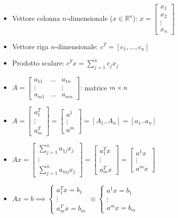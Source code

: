 \documentclass[12pt]{extarticle} %
\begin{document}
\begin{itemize}
    \item Vettore colonna $n$-dimensionale ($x \in \mathbb{R}^n$): $
    x = \begin{bmatrix}
        x_1\\x_2\\\vdots\\x_n
    \end{bmatrix}
    $
    \item Vettore riga $n$-dimensionale: $c^T = [c_1, \dots, c_n]$
    \item Prodotto scalare: $c^T x = \sum_{j=1}^{n} c_j x_j$
    \item $A = \begin{bmatrix}
        a_{11} & \dots & a_{1n}\\
        \vdots & & \vdots\\
        a_{m1} & \dots & a_{mn}
    \end{bmatrix}$: matrice $m\times n$
    \item $A = \begin{bmatrix}
        a_1^T\\\vdots\\a^T_m
    \end{bmatrix} = \begin{bmatrix}
        a^1\\\vdots\\a^m
    \end{bmatrix} = [A_1..A_n] = [a_1..a_n]$

    \item $Ax = \begin{bmatrix}
        \sum_{j=1}^n a_{1j}x_j\\\vdots\\\sum_{j=1}^n a_{mj}x_j
    \end{bmatrix} = \begin{bmatrix}
        a_1^Tx\\\vdots\\a^T_mx
    \end{bmatrix} = \begin{bmatrix}
        a^1x\\\vdots\\a^mx
    \end{bmatrix}$

    \item $Ax=b \implies \begin{cases}
        a_1^Tx=b_1\\\vdots\\a_m^Tx=b_m
    \end{cases} \equiv \begin{cases}
        a^1x=b_1\\\vdots\\a^mx=b_m
    \end{cases}$
\end{itemize}
\end{document}
